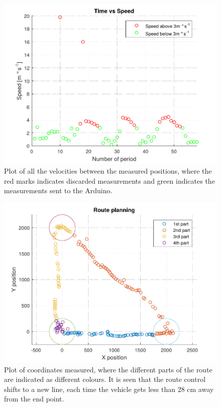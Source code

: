 \begin{figure}[H]
  \centering
	\includegraphics[scale=0.8]{figures/AccTest3.pdf}
	\caption{Plot of all the velocities between the measured positions, where the red marks indicates discarded measurements and green indicates the measurements sent to the Arduino.}
	\label{AccT3fig}
\end{figure}\vspace{-5mm}


\begin{figure}[H]
  \centering
	\includegraphics[scale=0.8]{figures/AccTest6.pdf}
	\caption{Plot of coordinates measured, where the different parts of the route are indicated as different colours. It is seen that the route control shifts to a new line, each time the vehicle gets less than 28 cm away from the end point.}
	\label{AccT6fig}
\end{figure}\vspace{-5mm}


